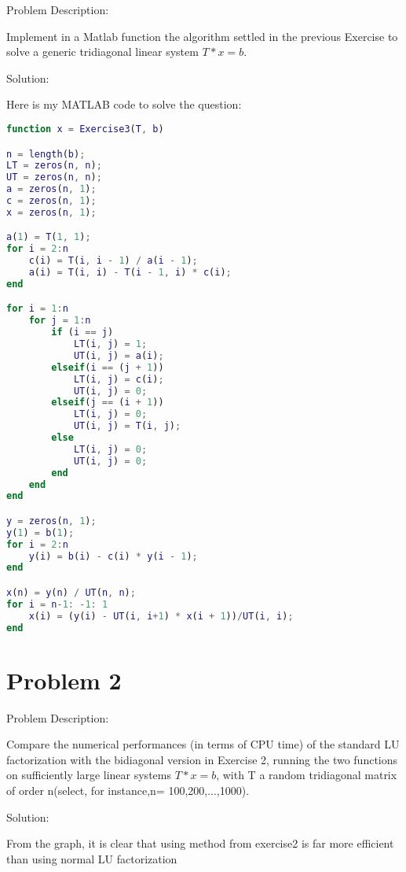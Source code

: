 \documentclass[12pt,letter,english]{article}
\begin{document}
Problem Description:

Implement  in  a Matlab function  the  algorithm  settled  in  the  previous Exercise to solve a generic tridiagonal linear system $T*x=b$.

Solution:

Here is my MATLAB code to solve the question:

\begin{lstlisting}[language = Matlab]
function x = Exercise3(T, b)

n = length(b);
LT = zeros(n, n);
UT = zeros(n, n);
a = zeros(n, 1);
c = zeros(n, 1);
x = zeros(n, 1);

a(1) = T(1, 1);
for i = 2:n
    c(i) = T(i, i - 1) / a(i - 1);
    a(i) = T(i, i) - T(i - 1, i) * c(i);
end

for i = 1:n
    for j = 1:n
        if (i == j) 
            LT(i, j) = 1;
            UT(i, j) = a(i);
        elseif(i == (j + 1)) 
            LT(i, j) = c(i);
            UT(i, j) = 0;
        elseif(j == (i + 1)) 
            LT(i, j) = 0;
            UT(i, j) = T(i, j);
        else
            LT(i, j) = 0;
            UT(i, j) = 0;
        end
    end
end

y = zeros(n, 1);
y(1) = b(1);
for i = 2:n
    y(i) = b(i) - c(i) * y(i - 1);
end

x(n) = y(n) / UT(n, n);
for i = n-1: -1: 1
    x(i) = (y(i) - UT(i, i+1) * x(i + 1))/UT(i, i);
end
\end{lstlisting}

\section*{Problem 2}

Problem Description: 

Compare the numerical performances (in terms of CPU time) of the standard LU factorization with the bidiagonal version in Exercise 2, running the two functions on sufficiently large linear systems $T*x=b$, with T a random tridiagonal matrix of order n(select, for instance,n= 100,200,...,1000).

Solution:

From the graph, it is clear that using method from exercise2 is far more efficient than using normal LU factorization
\end{document}
